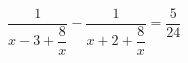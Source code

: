 \begin{ex}[type=equation]
	\begin{condition}
		$\dfrac{1}{x - 3 + \dfrac{8}{x}} - \dfrac{1}{x + 2 + \dfrac{8}{x}} = \dfrac{5}{24}$
	\end{condition}
\end{ex}
